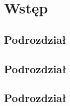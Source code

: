 \chapter{Wstęp}

\section{Podrozdział}

\bt

\section{Podrozdział}

\bt

\section{Podrozdział}

\bt
